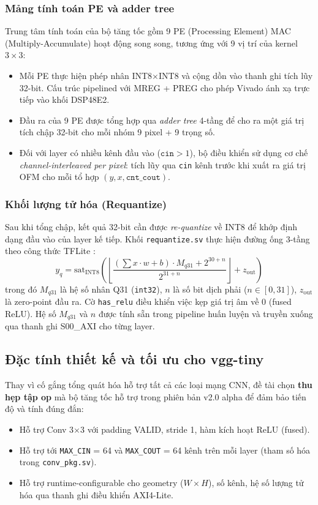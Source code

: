 \subsubsection{Mảng tính toán PE và adder tree}
Trung tâm tính toán của bộ tăng tốc gồm 9 PE (Processing Element) MAC (Multiply-Accumulate) hoạt động song song, tương ứng với 9 vị trí của kernel $3 \times 3$:
\begin{itemize}
    \item Mỗi PE thực hiện phép nhân INT8$\times$INT8 và cộng dồn vào thanh ghi tích lũy 32-bit. Cấu trúc pipelined với MREG + PREG cho phép Vivado ánh xạ trực tiếp vào khối DSP48E2.
    \item Đầu ra của 9 PE được tổng hợp qua \textit{adder tree} 4-tầng để cho ra một giá trị tích chập 32-bit cho mỗi nhóm 9 pixel + 9 trọng số.
    \item Đối với layer có nhiều kênh đầu vào ($\texttt{cin} > 1$), bộ điều khiển sử dụng cơ chế \textit{channel-interleaved per pixel}: tích lũy qua \texttt{cin} kênh trước khi xuất ra giá trị OFM cho mỗi tổ hợp $(y, x, \texttt{cnt\_cout})$.
\end{itemize}

\subsubsection{Khối lượng tử hóa (Requantize)}
Sau khi tổng chập, kết quả 32-bit cần được \textit{re-quantize} về INT8 để khớp định dạng đầu vào của layer kế tiếp. Khối \texttt{requantize.sv} thực hiện đường ống 3-tầng theo công thức TFLite \cite{jacob2018quantization}:
\begin{equation}
    y_q = \mathrm{sat}_{\mathrm{INT8}}\!\left( \left\lfloor \frac{(\sum x \cdot w + b) \cdot M_{q31} + 2^{30+n}}{2^{31+n}} \right\rfloor + z_{\mathrm{out}} \right)
\end{equation}
trong đó $M_{q31}$ là hệ số nhân Q31 (\texttt{int32}), $n$ là số bit dịch phải ($n \in [0, 31]$), $z_{\mathrm{out}}$ là zero-point đầu ra. Cờ \texttt{has\_relu} điều khiển việc kẹp giá trị âm về 0 (fused ReLU). Hệ số $M_{q31}$ và $n$ được tính sẵn trong pipeline huấn luyện và truyền xuống qua thanh ghi S00\_AXI cho từng layer.

\subsection{Đặc tính thiết kế và tối ưu cho vgg-tiny}
\label{sec:accel_optimize}
Thay vì cố gắng tổng quát hóa hỗ trợ tất cả các loại mạng CNN, đề tài chọn \textbf{thu hẹp tập op} mà bộ tăng tốc hỗ trợ trong phiên bản v2.0 alpha để đảm bảo tiến độ và tính đúng đắn:
\begin{itemize}
    \item Hỗ trợ Conv 3$\times$3 với padding VALID, stride 1, hàm kích hoạt ReLU (fused).
    \item Hỗ trợ tới \texttt{MAX\_CIN} = 64 và \texttt{MAX\_COUT} = 64 kênh trên mỗi layer (tham số hóa trong \texttt{conv\_pkg.sv}).
    \item Hỗ trợ runtime-configurable cho geometry ($W \times H$), số kênh, hệ số lượng tử hóa qua thanh ghi điều khiển AXI4-Lite.
\end{itemize}

